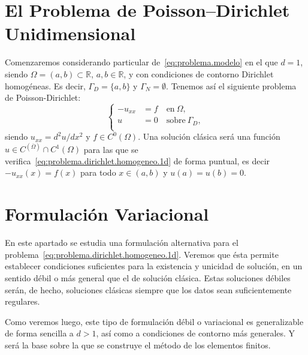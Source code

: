 \documentclass[11pt]{article}
\theoremstyle{plain}
\theoremstyle{definition}
\newcommand{\R}{\ensuremath{\mathbb{R}}}
\newcommand{\en}{\quad\text{en}\ }
\newcommand{\sobre}{\quad\text{sobre}\ }
\newcommand{\uxx}{\ensuremath{u_{xx}}\xspace}
\begin{document}
\section{El Problema de Poisson--Dirichlet Unidimensional}

Comenzaremos considerando particular de~\eqref{eq:problema.modelo} en el que $d=1$, siendo $\Omega=(a,b)\subset\R$, $a,b\in\R$, y con condiciones de contorno Dirichlet homogéneas. Es decir, $\Gamma_D=\{a,b\}$ y $\Gamma_N=\emptyset$. Tenemos así el siguiente problema de Poisson-Dirichlet: 
\begin{equation}
  \left\{
    \begin{aligned}
      - \uxx &= f \en{\Omega}, \\
      u&=0 \sobre{\Gamma_D}, \\
    \end{aligned}
  \right.
  \label{eq:problema.dirichlet.homogeneo.1d}
\end{equation}
siendo $\uxx = d^2 u/d x^2$ y $f\in C^0(\Omega)$. Una solución clásica será una función $u\in C^(\overline\Omega)\cap C^1(\Omega)$ para las que se verifica~\eqref{eq:problema.dirichlet.homogeneo.1d} de forma puntual, es decir $-u_{xx}(x)=f(x)$ para todo $x\in(a,b)$ y $u(a)=u(b)=0$.


\section{Formulación Variacional}

En este apartado se estudia una formulación alternativa para el problema~\eqref{eq:problema.dirichlet.homogeneo.1d}. Veremos que ésta permite establecer condiciones suficientes para la existencia y unicidad de solución, en un sentido débil o más general que el de solución clásica. Estas soluciones débiles serán, de hecho, soluciones clásicas siempre que los datos sean suficientemente regulares.

Como veremos luego, este tipo de formulación débil o variacional es generalizable de forma sencilla a $d>1$, así como a  condiciones de contorno más generales. Y será la base sobre la que  se construye el método de los elementos finitos. 
\end{document}
